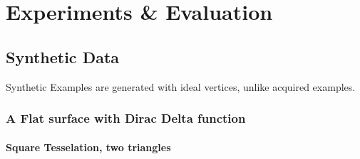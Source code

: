 \documentclass[openany]{book}
\begin{document}
\chapter{Experiments \& Evaluation}
\section{Synthetic Data}
Synthetic Examples are generated with ideal vertices, unlike acquired examples.

\subsection{A Flat surface with Dirac Delta function}
\subsubsection{Square Tesselation, two triangles}
\end{document}
